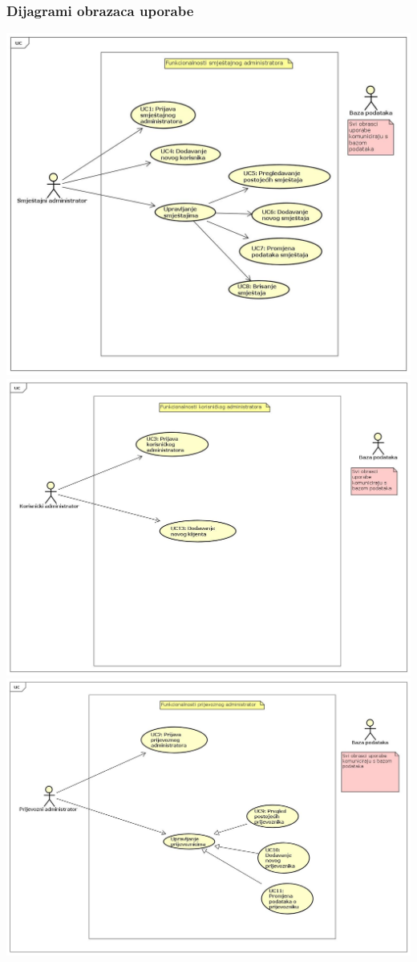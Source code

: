 					
				\subsubsection{Dijagrami obrazaca uporabe}
					
					\includegraphics[scale=0.37]{./dijagrami/fun_house}
					\eject
					\includegraphics[scale=0.33]{./dijagrami/fun_trans}
					\eject
					\includegraphics[scale=0.3]{./dijagrami/fun_kor}
				\eject		
				
